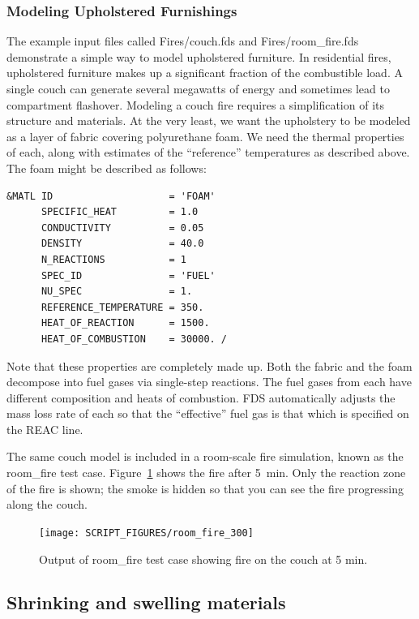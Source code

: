 \documentclass[11pt]{book}
\begin{document}
\subsubsection{Modeling Upholstered Furnishings}

The example input files called {\ct Fires/couch.fds} and {\ct Fires/room\_fire.fds} demonstrate a simple way to model upholstered furniture.
In residential fires, upholstered furniture makes up a significant
fraction of the combustible load. A single couch can generate several
megawatts of energy and sometimes lead to compartment flashover. Modeling
a couch fire requires a simplification of its structure and materials.
At the very least, we want the upholstery to be modeled as a layer of fabric covering polyurethane foam. We need the thermal properties of each, along with estimates of the ``reference'' temperatures as described above. The foam might be described as follows:
\begin{lstlisting}
&MATL ID                    = 'FOAM'
      SPECIFIC_HEAT         = 1.0
      CONDUCTIVITY          = 0.05
      DENSITY               = 40.0
      N_REACTIONS           = 1
      SPEC_ID               = 'FUEL'
      NU_SPEC               = 1.
      REFERENCE_TEMPERATURE = 350.
      HEAT_OF_REACTION      = 1500.
      HEAT_OF_COMBUSTION    = 30000. /
\end{lstlisting}
Note that these properties are completely made up.
Both the fabric and the foam decompose into fuel gases via
single-step reactions. The fuel gases from each have different
composition and heats of combustion. FDS automatically adjusts
the mass loss rate of each so that the ``effective'' fuel gas
is that which is specified on the {\ct REAC} line.

The same couch model is included in a room-scale fire simulation, known as the
{\ct room\_fire} test case. Figure~\ref{room_fire} shows the fire after 5~min.
Only the reaction zone of the fire is shown; the smoke is hidden so that you can see the fire progressing
along the couch.

\begin{figure}[ht]
\texttt{[image: SCRIPT\_FIGURES/room\_fire\_300]}
\caption[Results of the {\ct room\_fire} test case]{Output of {\ct room\_fire} test case showing fire on the couch at
5 min.}
\label{room_fire}
\end{figure}

\subsection{Shrinking and swelling materials}
\label{info:shrink_swell}
\end{document}
